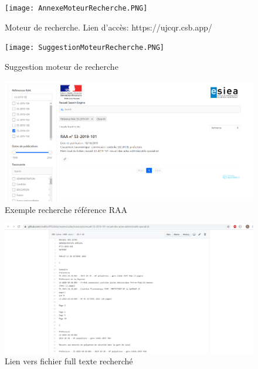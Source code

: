 \begin{figure}[h!]
  \texttt{[image: AnnexeMoteurRecherche.PNG]}
	\caption{Moteur de recherche. Lien d'accès: https://ujcqr.csb.app/}
	\label{}
\end{figure}

\begin{figure}[h!]
  \texttt{[image: SuggestionMoteurRecherche.PNG]}
	\caption{Suggestion moteur de recherche}
	\label{}
\end{figure}

\begin{figure}[h!]
  \includegraphics[width=\linewidth]{images/rechercheReferenceMoteurRecherche.PNG}
	\caption{Exemple recherche référence RAA}
	\label{}
\end{figure}

\begin{figure}[h!]
  \includegraphics[width=\linewidth]{images/annexeLienVersRecherche.PNG}
	\caption{Lien vers fichier full texte recherché}
	\label{}
\end{figure}
